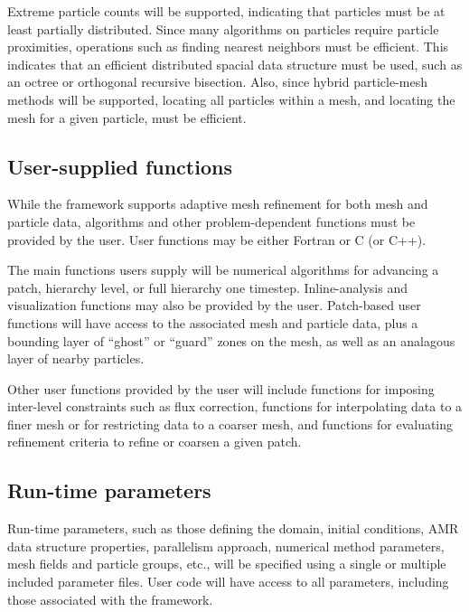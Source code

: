 \documentclass{article}
\begin{document}
Extreme particle counts will be supported, indicating that particles
must be at least partially distributed.  Since many algorithms on
particles require particle proximities, operations such as finding
nearest neighbors must be efficient.  This indicates that an efficient
distributed spacial data structure must be used, such as an octree or
orthogonal recursive bisection.  Also, since hybrid particle-mesh
methods will be supported, locating all particles within a mesh, and
locating the mesh for a given particle, must be efficient.


\subsection{User-supplied functions}

While the framework supports adaptive mesh refinement for both mesh
and particle data, algorithms and other problem-dependent functions
must be provided by the user.  User functions may be either Fortran or
C (or C++).  

The main functions users supply will be numerical algorithms for
advancing a patch, hierarchy level, or full hierarchy one timestep.
Inline-analysis and visualization functions may also be provided by
the user.  Patch-based user functions will have access to the
associated mesh and particle data, plus a bounding layer of ``ghost''
or ``guard'' zones on the mesh, as well as an analagous layer of
nearby particles.

Other user functions provided by the user will include functions for
imposing inter-level constraints such as flux correction, functions
for interpolating data to a finer mesh or for restricting data to a
coarser mesh, and functions for evaluating refinement criteria to
refine or coarsen a given patch.


\subsection{Run-time parameters}

Run-time parameters, such as those defining the domain, initial
conditions, AMR data structure properties, parallelism approach,
numerical method parameters, mesh fields and particle groups, etc.,
will be specified using a single or multiple included parameter files.
User code will have access to all parameters, including those
associated with the framework.
\end{document}
